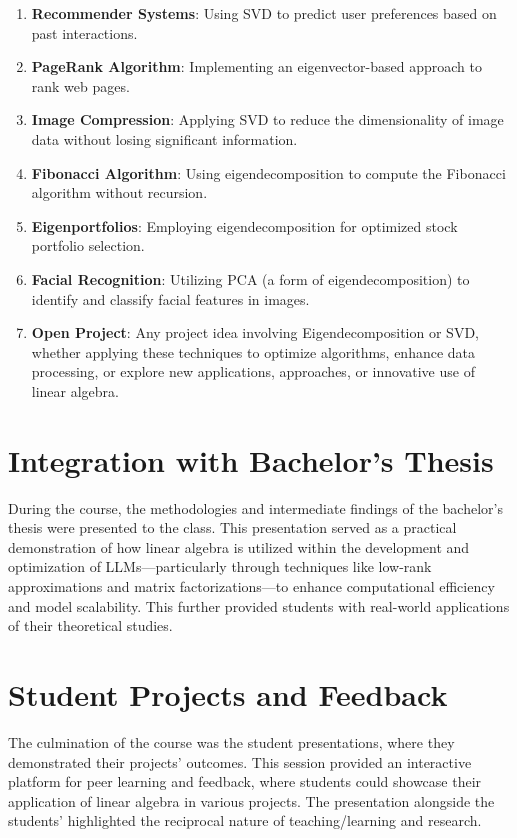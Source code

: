 \begin{enumerate}
  \item \textbf{Recommender Systems}: Using SVD to predict user preferences based on past interactions.
  \item \textbf{PageRank Algorithm}: Implementing an eigenvector-based approach to rank web pages.
  \item \textbf{Image Compression}: Applying SVD to reduce the dimensionality of image data without losing significant information.
  \item \textbf{Fibonacci Algorithm}: Using eigendecomposition to compute the Fibonacci algorithm without recursion.
  \item \textbf{Eigenportfolios}: Employing eigendecomposition for optimized stock portfolio selection.
  \item \textbf{Facial Recognition}: Utilizing PCA (a form of eigendecomposition) to identify and classify facial features in images.
  \item \textbf{Open Project}: Any project idea involving Eigendecomposition or SVD, whether applying these techniques to optimize algorithms, enhance data processing, or explore new applications, approaches, or innovative use of linear algebra.
\end{enumerate}

\section*{Integration with Bachelor's Thesis}

During the course, the methodologies and intermediate findings of the bachelor's thesis were presented to the class. This presentation served as a practical demonstration of how linear algebra is utilized within the development and optimization of LLMs—particularly through techniques like low-rank approximations and matrix factorizations—to enhance computational efficiency and model scalability. This further provided students with real-world applications of their theoretical studies.

\section*{Student Projects and Feedback}

The culmination of the course was the student presentations, where they demonstrated their projects' outcomes. This session provided an interactive platform for peer learning and feedback, where students could showcase their application of linear algebra in various projects. The presentation alongside the students' highlighted the reciprocal nature of teaching/learning and research.


